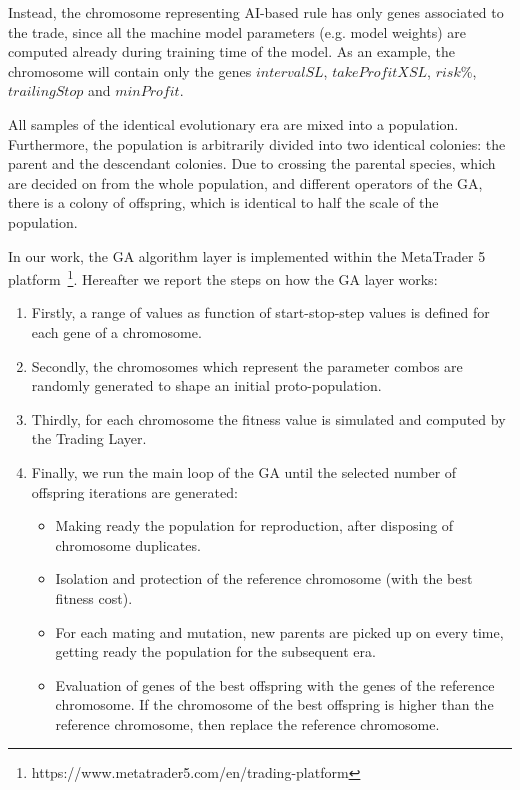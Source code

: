 Instead, the chromosome representing AI-based rule has only genes associated to the trade, since all the machine model parameters (e.g. model weights) are computed already during training time of the model. As an example, the chromosome will contain only the genes $intervalSL$, $takeProfitXSL$, $risk\%$, $trailingStop$ and $minProfit$.

All samples of the identical evolutionary era are mixed into a population. Furthermore, the population is arbitrarily divided into two identical colonies: the parent and the descendant colonies. Due to crossing the parental species, which are decided on from the whole population, and different operators of the GA, there is a colony of offspring, which is identical to half the scale of the population.

In our work, the GA algorithm layer is implemented within the MetaTrader 5 platform~\footnote{https://www.metatrader5.com/en/trading-platform}.
Hereafter we report the steps on how the GA layer works:

\begin{enumerate}
\setlength\itemsep{0.3em}
\item Firstly, a range of values as function of start-stop-step values is defined for each gene of a chromosome.
\item Secondly, the chromosomes which represent the parameter combos are randomly generated to shape an initial proto-population.
\item Thirdly, for each chromosome the fitness value is simulated and computed by the Trading Layer.
\item Finally, we run the main loop of the GA until the selected number of offspring iterations are generated:
\begin{itemize}	
	\item Making ready the population for reproduction, after disposing of chromosome duplicates.
	\item Isolation and protection of the reference chromosome (with the best fitness cost).
	\item For each mating and mutation, new parents are picked up on every time, getting ready the population for the subsequent era.
	\item Evaluation of genes of the best offspring with the genes of the reference chromosome. If the chromosome of the best offspring is higher than the reference chromosome, then replace the reference chromosome.
\end{itemize}
\end{enumerate}

